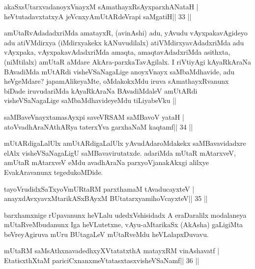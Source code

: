 \begin{shl}
akaSxsUtarxvadanoyxVnayxM sAmathayxRsAyxparxhANataH |
heVtutadavxtatxyA jeVcnxyA\s mUtARdeVrapi saMgatiH\hfill || 33 ||
\end{shl}

\begin{artha}
amUtaRvAdadadxriMda amatayxR, (avinAshi) adu, yAvudu vAyxpakavAgideyo
adu atiVMdirxya (iMdirxyakekx kANuvudilalx) atiVMdirxyavAdadxriMda
adu vAyxpaka, vAyxpakavAdadxriMda amaqta, amaqtavAdadxriMda asithxta,
(niMtilalx) amUtaR aMdare AkAra-parxkaTavAgilalx. I riVtiyAgi
kAyaRkAraNa BAvadiMda mUtARdi visheVSaNagaLige anoyxVnayx saMbaMdhavide,
adu heVgeMdare? japamAlikeyaMte, oMdakokxMdu iruva sAmathayxRvanunx
biDade iruvudariMda kAyaRkAraNa BAvadiMdaleV amUtARdi visheVSaNagaLige
saMbaMdhavideyeMdu tiLiyabeVku ||
\end{artha}


\begin{shl}
saMBaveV\s nayxtamasAyxpi saveVRSAM saMBavoV yataH |
atoV\s vadhAraNAthARya taterxYva garxhaNaM kaqtamf\hfill || 34 ||
\end{shl}

\begin{artha}
mUtARdigaLalUlx amUtARdigaLalUlx yAvudAdaroMdakekx saMBavavidadxre elAlx visheVSaNagaLigU saMBavavirutatxde. adariMda mUtaR mAtarxveV, amUtaR mAtarxveV eMdu avadhAraNa parxyoVjanakAkxgi alilxye EvakAravanunx tegedukoMDide.
\end{artha}



\begin{shl}
tayoVrudidxSaTxyoVmURtaRM parxthamaM tAvaducayxteV |
anayxdAvxyavxMtarikASxBAyxM BUtatarxyamihoVcayxteV\hfill || 35 ||
\end{shl}

\begin{artha}
barxhamxnige rUpavanunx heVLalu udedxVshisidadx A eraDaralilx modalaneya mUtaRveMbudanunx Iga heVLutetxne, vAyu-aMtarikaSx (AkAsha) gaLigiMta beVreyAgiruva mUru BUtagaLeV mUtaRveMdu heVLalapxDuvavu.
\end{artha}



\begin{shl}
mUtaRM saMsAthxnavadedhxyXVtatatxthA matayxRM vinAshavatf |
EtatisxthXtaM pariciCxnanxmeVtatasxtasxvisheVSaNamf\hfill || 36 ||
\end{shl}

